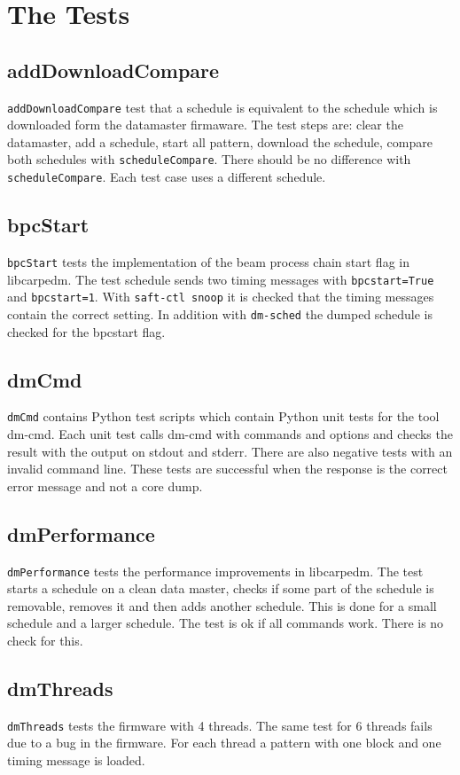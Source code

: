 \documentclass[12pt,a4paper]{report}
\begin{document}
\chapter{The Tests}
\section{addDownloadCompare}
\texttt{addDownloadCompare} test that a schedule is equivalent to the schedule which is downloaded form the datamaster firmaware.
The test steps are: clear the datamaster, add a schedule, start all pattern, download the schedule, compare both schedules with \texttt{scheduleCompare}. 
There should be no difference with \texttt{scheduleCompare}. Each test case uses a different schedule.
\section{bpcStart}
\texttt{bpcStart} tests the implementation of the beam process chain start flag in libcarpedm.
The test schedule sends two timing messages with \texttt{bpcstart=True} and \texttt{bpcstart=1}.
With \texttt{saft-ctl snoop} it is checked that the timing messages contain the correct setting.
In addition with \texttt{dm-sched} the dumped schedule is checked for the bpcstart flag.
\section{dmCmd}
\texttt{dmCmd} contains Python test scripts which contain Python unit tests for the tool dm-cmd. Each unit test calls dm-cmd
with commands and options and checks the result with the output on stdout and stderr. There are also negative tests with an invalid command
line. These tests are successful when the response is the correct error message and not a core dump.
\section{dmPerformance}
\texttt{dmPerformance} tests the performance improvements in libcarpedm.
The test starts a schedule on a clean data master, checks if some part of the schedule is removable, removes it and
then adds another schedule. This is done for a small schedule and a larger schedule. The test is ok if all commands
work. There is no check for this.
\section{dmThreads}
\texttt{dmThreads} tests the firmware with 4 threads. The same test for 6 threads fails due to a bug in the
firmware. For each thread a pattern with one block and one timing message is loaded.
\end{document}
